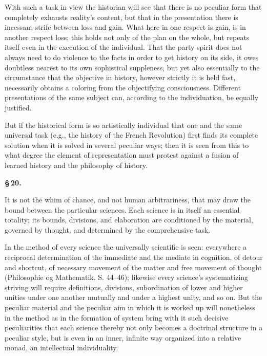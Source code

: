 \documentclass[12pt]{book}
\begin{document}
With such a task in view the historian will see that there is no peculiar form that completely exhausts
reality's content, but that in the presentation there is incessant strife between loss and gain. What here
in one respect is gain, is in another respect
loss; this holds not only of the plan on the whole, but repeats itself even in the execution of the
individual. That the party spirit does not always need to do violence to the facts in order to get history
on its side, it owes doubtless nearest to its own sophistical suppleness, but yet also essentially to the
circumstance that the objective in history, however strictly it is held fast, necessarily obtains a
coloring from the objectifying consciousness. Different presentations of the same subject can, according
to the individuation, be equally justified.

But if the historical form is so artistically individual that one and the same universal task (e.g., the
history of the French Revolution) first finds its complete solution when it is solved in several peculiar
ways; then it is seen from this to what degree the element of representation must protest against a fusion
of learned history and the philosophy of history.

\begin{center}{\bfseries \S\,20.}\end{center}

It is not the whim of chance, and not human arbitrariness, that may draw the bound between the particular
sciences. Each science is in itself an essential totality; its bounds, divisions, and elaboration are
conditioned by the material, governed by thought, and determined by the comprehensive task.

In the method of every science the universally scientific is seen: everywhere a reciprocal determination of
the immediate and the mediate in cognition, of detour and shortcut, of necessary movement of the matter and
free movement of thought (Philosophie og Mathematik. S. 44--46); likewise every science's systematizing
striving will require definitions, divisions, subordination of lower and higher unities under one another
mutually and under a highest unity, and so on. But the peculiar material and the peculiar aim in which it is
worked up will nonetheless in the method as in the formation of system
bring with it such decisive peculiarities that each science thereby not only becomes a doctrinal structure
in a peculiar style, but is even in an inner, infinite way organized into a relative monad, an intellectual
individuality.
\end{document}
